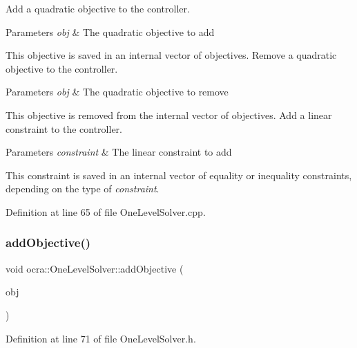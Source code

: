 Add a quadratic objective to the controller.


\begin{DoxyParams}{Parameters}
{\em obj} & The quadratic objective to add\\
\hline
\end{DoxyParams}
This objective is saved in an internal vector of objectives. Remove a quadratic objective to the controller.


\begin{DoxyParams}{Parameters}
{\em obj} & The quadratic objective to remove\\
\hline
\end{DoxyParams}
This objective is removed from the internal vector of objectives. Add a linear constraint to the controller.


\begin{DoxyParams}{Parameters}
{\em constraint} & The linear constraint to add\\
\hline
\end{DoxyParams}
This constraint is saved in an internal vector of equality or inequality constraints, depending on the type of {\itshape constraint}. 

Definition at line 65 of file One\+Level\+Solver.\+cpp.

\hypertarget{classocra_1_1OneLevelSolver_ad43ed5d37424a70fc9c5ef9e7cb3b0fa}{}\label{classocra_1_1OneLevelSolver_ad43ed5d37424a70fc9c5ef9e7cb3b0fa} 
\subsubsection{\texorpdfstring{add\+Objective()}{addObjective()}}
{\footnotesize\ttfamily void ocra\+::\+One\+Level\+Solver\+::add\+Objective (\begin{DoxyParamCaption}\item[{\hyperlink{classocra_1_1OneLevelSolver_a93b0be052a859bbd4c81584aa1646ffb}{Objective\+Type} \&}]{obj }\end{DoxyParamCaption})\hspace{0.3cm}{\ttfamily [inline]}}



Definition at line 71 of file One\+Level\+Solver.\+h.

\hypertarget{classocra_1_1OneLevelSolver_a08ecd92d4295e03aa03075a71d481f48}{}\label{classocra_1_1OneLevelSolver_a08ecd92d4295e03aa03075a71d481f48} 
